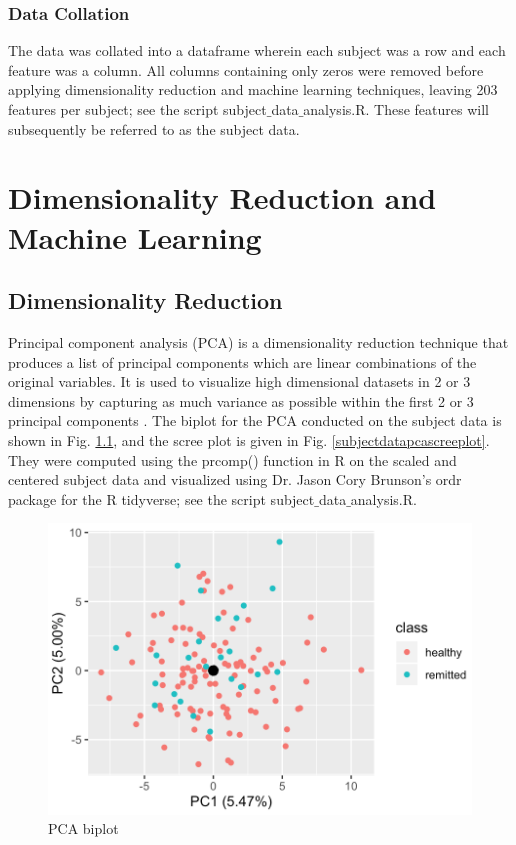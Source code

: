 \documentclass[12pt]{report}
\begin{document}
			\subsection{Data Collation}		
			The data was collated into a dataframe wherein each subject was a row and each feature was a column. All columns containing only zeros were removed before applying dimensionality reduction and machine learning techniques, leaving 203 features per subject; see the script subject$\_$data$\_$analysis.R. These features will subsequently be referred to as the subject data.
		
	\chapter{Dimensionality Reduction and Machine Learning}
		\section{Dimensionality Reduction}
		Principal component analysis (PCA) is a dimensionality reduction technique that produces a list of principal components which are linear combinations of the original variables. It is used to visualize high dimensional datasets in 2 or 3 dimensions by capturing as much variance as possible within the first 2 or 3 principal components \cite{james2013introduction}. The biplot for the PCA conducted on the subject data is shown in Fig. \ref{subjectdatapcabiplot}, and the scree plot is given in Fig. \ref{subjectdatapcascreeplot}. They were computed using the prcomp() function in R on the scaled and centered subject data and visualized using Dr. Jason Cory Brunson's ordr package for the R tidyverse; see the script subject$\_$data$\_$analysis.R.
		
		\begin{figure}[H]
			\centering
			\includegraphics[scale=0.8]{Images/subjectdata_biplot.png}
			\caption{PCA biplot}
			\label{subjectdatapcabiplot}
		\end{figure}
	
\end{document}
